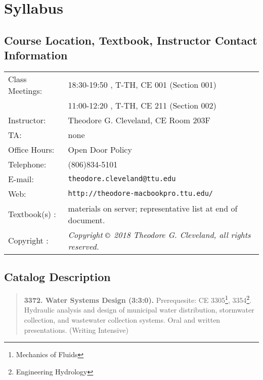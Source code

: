 \documentclass[12pt]{article}
\begin{document}
\section*{Syllabus}

\subsection*{{Course Location, Textbook, Instructor Contact Information}}
\begin{tabular}{p{1.5in}p{5.0in}}
Class Meetings:  &    18:30-19:50 , T-TH, CE 001 (Section 001) \\
~ &    11:00-12:20 , T-TH, CE 211 (Section 002) \\
Instructor: & Theodore G. Cleveland, CE Room 203F \\
TA: & none \\
Office Hours: & Open Door Policy \\
Telephone: & (806)834-5101 \\
E-mail: & \texttt{theodore.cleveland@ttu.edu}\\
Web: & \texttt{http://theodore-macbookpro.ttu.edu/} \\
Textbook(s) : &  materials on server; representative list at end of document. \\ 
Copyright : & \textsl{Copyright $\copyright$ 2018 Theodore G. Cleveland, all rights reserved.} \\
\end{tabular}
\subsection*{{Catalog Description}}
\begin{quote} \textbf{3372. Water Systems Design (3:3:0).}  Prerequesite: CE 3305\footnote{Mechanics of Fluids}, 3354\footnote{Engineering Hydrology}.  Hydraulic analysis and design of municipal water distribution, stormwater collection, and wastewater collection systems.  Oral and written presentations. (Writing Intensive)
\end{quote}
\end{document}

